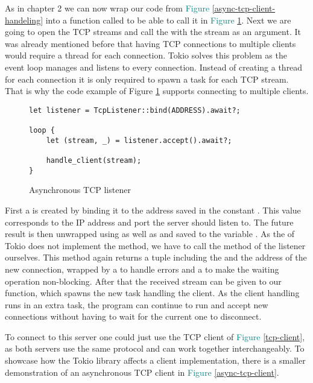 As in chapter 2 we can now wrap our code from \textcolor{teal}{Figure \ref{async-tcp-client-handeling}} into a function
called  to be able to call it in \textcolor{teal}{Figure \ref{async-tcp-listener}}. Next we are
going to open the TCP streams and call the  with the stream as an argument. It was already
mentioned before that having TCP connections to multiple clients would require a thread for each connection. Tokio
solves this problem as the event loop manages and listens to every connection. Instead of creating a thread for each
connection it is only required to spawn a task for each TCP stream. That is why the code example of Figure
\textcolor{teal}{\ref{async-tcp-listener}} supports connecting to multiple clients.

\begin{figure}[ht]
    \begin{verbatim}
let listener = TcpListener::bind(ADDRESS).await?;

loop {
    let (stream, _) = listener.accept().await?;

    handle_client(stream);
}
    \end{verbatim}
    \caption{Asynchronous TCP listener}
    \label{async-tcp-listener}
\end{figure}

First a  is created by binding it to the address saved in the  constant
. This value corresponds to the IP address and port the server should listen to. The future result is
then unwrapped using  as well as  and saved to the variable . As the
 of Tokio does not implement the  method, we have to call the  method of
the listener ourselves. This method again returns a tuple including the  and the address of the new
connection, wrapped by a  to handle errors and a  to make the waiting operation non-blocking.
After that the received stream can be given to our  function, which spawns the new task handling
the client. As the client handling runs in an extra task, the program can continue to run and accept new connections
without having to wait for the current one to disconnect.

To connect to this server one could just use the TCP client of \textcolor{teal}{Figure \ref{tcp-client}}, as both
servers use the same protocol and can work together interchangeably. To showcase how the Tokio library affects a client
implementation, there is a smaller demonstration of an asynchronous TCP client in
\textcolor{teal}{Figure \ref{async-tcp-client}}.

